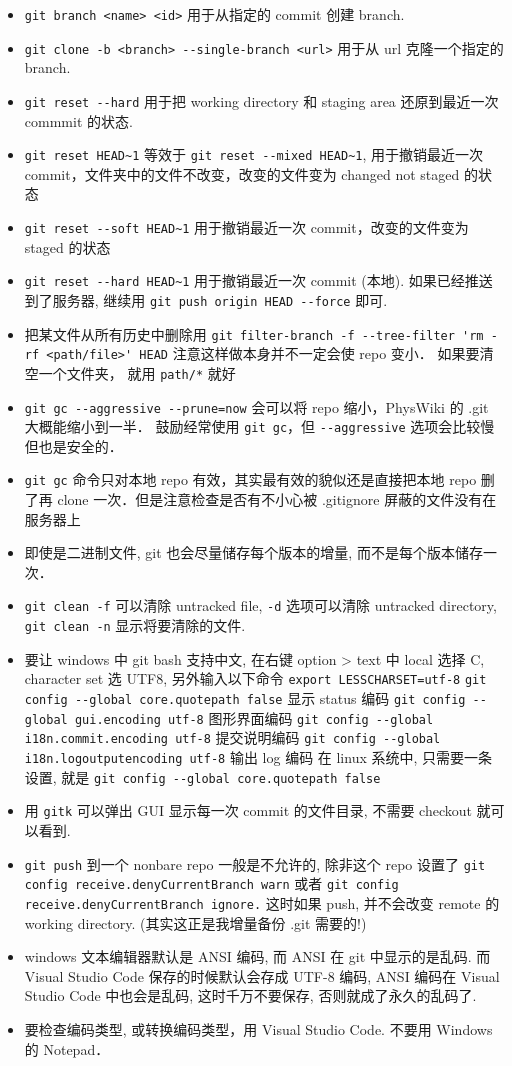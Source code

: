 \begin{itemize}
\item \verb|git branch <name> <id>| 用于从指定的 commit 创建 branch.
\item \verb|git clone -b <branch> --single-branch <url>| 用于从 url 克隆一个指定的 branch.
\item \verb|git reset --hard| 用于把 working directory 和 staging area 还原到最近一次 commmit 的状态.
\item \verb|git reset HEAD~1| 等效于 \verb|git reset --mixed HEAD~1|, 用于撤销最近一次 commit，文件夹中的文件不改变，改变的文件变为 changed not staged 的状态
\item \verb|git reset --soft HEAD~1| 用于撤销最近一次 commit，改变的文件变为 staged 的状态
\item \verb|git reset --hard HEAD~1| 用于撤销最近一次 commit (本地). 如果已经推送到了服务器, 继续用 \verb|git push origin HEAD --force| 即可.
\item 把某文件从所有历史中删除用 \verb|git filter-branch -f --tree-filter 'rm -rf <path/file>' HEAD| 注意这样做本身并不一定会使 repo 变小． 如果要清空一个文件夹， 就用 \verb|path/*| 就好
\item \verb|git gc --aggressive --prune=now| 会可以将 repo 缩小，PhysWiki 的 .git 大概能缩小到一半． 鼓励经常使用 \verb|git gc|，但 \verb|--aggressive| 选项会比较慢但也是安全的．
\item \verb|git gc| 命令只对本地 repo 有效，其实最有效的貌似还是直接把本地 repo 删了再 clone 一次．但是注意检查是否有不小心被 .gitignore 屏蔽的文件没有在服务器上
\item 即使是二进制文件, git 也会尽量储存每个版本的增量, 而不是每个版本储存一次．
\item \verb|git clean -f| 可以清除 untracked file, \verb|-d| 选项可以清除 untracked directory,  \verb|git clean -n| 显示将要清除的文件.
\item 要让 windows 中 git bash 支持中文, 在右键 option > text 中 local 选择 C, character set 选 UTF8, 另外输入以下命令
\verb|export LESSCHARSET=utf-8|
\verb|git config --global core.quotepath false|     显示 status 编码
\verb|git config --global gui.encoding utf-8|    图形界面编码
\verb|git config --global i18n.commit.encoding utf-8|   提交说明编码
\verb|git config --global i18n.logoutputencoding utf-8| 输出 log 编码
在 linux 系统中, 只需要一条设置, 就是
\verb|git config --global core.quotepath false|
\item 用 \verb|gitk| 可以弹出 GUI 显示每一次 commit 的文件目录, 不需要 checkout 就可以看到.
\item \verb|git push| 到一个 nonbare repo 一般是不允许的, 除非这个 repo 设置了 \verb|git config receive.denyCurrentBranch warn| 或者 \verb|git config receive.denyCurrentBranch ignore.| 这时如果 push, 并不会改变 remote 的 working directory. (其实这正是我增量备份 .git 需要的!)
\item windows 文本编辑器默认是 ANSI 编码, 而 ANSI 在 git 中显示的是乱码. 而 Visual Studio Code 保存的时候默认会存成 UTF-8 编码, ANSI 编码在 Visual Studio Code 中也会是乱码, 这时千万不要保存, 否则就成了永久的乱码了.
\item 要检查编码类型, 或转换编码类型，用 Visual Studio Code.  不要用 Windows 的 Notepad．
\end{itemize}
